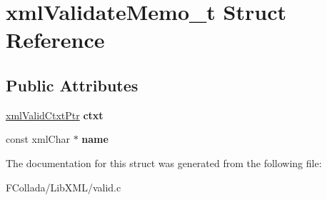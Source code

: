 \hypertarget{structxmlValidateMemo__t}{
\section{xmlValidateMemo\_\-t Struct Reference}
\label{structxmlValidateMemo__t}
}
\subsection*{Public Attributes}
\begin{DoxyCompactItemize}
\item 
\hypertarget{structxmlValidateMemo__t_a3103a81163ee0ad8a6573634d276ab67}{
\hyperlink{struct__xmlValidCtxt}{xmlValidCtxtPtr} {\bfseries ctxt}}
\label{structxmlValidateMemo__t_a3103a81163ee0ad8a6573634d276ab67}

\item 
\hypertarget{structxmlValidateMemo__t_a8659d60c1f7694dba123f08234120a3d}{
const xmlChar $\ast$ {\bfseries name}}
\label{structxmlValidateMemo__t_a8659d60c1f7694dba123f08234120a3d}

\end{DoxyCompactItemize}


The documentation for this struct was generated from the following file:\begin{DoxyCompactItemize}
\item 
FCollada/LibXML/valid.c\end{DoxyCompactItemize}

